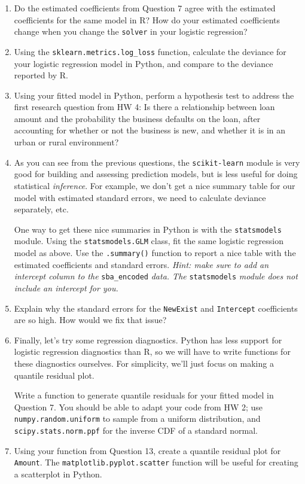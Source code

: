 \documentclass[11pt]{article}
\begin{document}
\begin{enumerate}
\item Do the estimated coefficients from Question 7 agree with the estimated coefficients for the same model in R? How do your estimated coefficients change when you change the \verb;solver; in your logistic regression?

\item Using the \verb;sklearn.metrics.log_loss; function, calculate the deviance for your logistic regression model in Python, and compare to the deviance reported by R.

\item Using your fitted model in Python, perform a hypothesis test to address the first research question from HW 4: Is there a relationship between loan amount and the probability the business defaults on the
loan, after accounting for whether or not the business is new, and whether it is in an urban
or rural environment?

\item As you can see from the previous questions, the \verb;scikit-learn; module is very good for building and assessing prediction models, but is less useful for doing statistical \textit{inference}. For example, we don't get a nice summary table for our model with estimated standard errors, we need to calculate deviance separately, etc.

One way to get these nice summaries in Python is with the \verb;statsmodels; module. Using the \verb;statsmodels.GLM; class, fit the same logistic regression model as above. Use the \verb;.summary(); function to report a nice table with the estimated coefficients and standard errors. \textit{Hint: make sure to add an intercept column to the} \verb;sba_encoded; \textit{data. The} \verb;statsmodels; \textit{module does not include an intercept for you.}

\item Explain why the standard errors for the \verb;NewExist; and \verb;Intercept; coefficients are so high. How would we fix that issue?

\item Finally, let's try some regression diagnostics. Python has less support for logistic regression diagnostics than R, so we will have to write functions for these diagnostics ourselves. For simplicity, we'll just focus on making a quantile residual plot.

Write a function to generate quantile residuals for your fitted model in Question 7. You should be able to adapt your code from HW 2; use \verb;numpy.random.uniform; to sample from a uniform distribution, and \verb;scipy.stats.norm.ppf; for the inverse CDF of a standard normal.

\item Using your function from Question 13, create a quantile residual plot for \verb;Amount;. The \verb;matplotlib.pyplot.scatter; function will be useful for creating a scatterplot in Python.
\end{enumerate}
\end{document}
